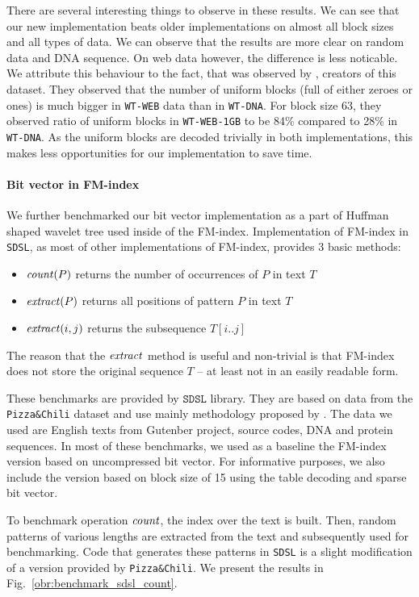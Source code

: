 There are several interesting things to observe in these results. We can see that our new implementation
beats older implementations on almost all block sizes and all types of data. We can observe that the
results are more clear on random data and DNA sequence. On web data however, the difference is less
noticable. We attribute this behaviour to the fact, that was observed by \cite{gog2014optimized},
creators of this dataset. They observed that the number of uniform blocks (full of either zeroes or ones)
is much bigger in \texttt{WT-WEB} data than in \texttt{WT-DNA}. For block size 63, they observed ratio of
uniform blocks in \texttt{WT-WEB-1GB} to be 84\% compared to 28\% in \texttt{WT-DNA}. As the uniform
blocks are decoded trivially in both implementations, this makes less opportunities for our implementation
to save time.

\paragraph{Bit vector in FM-index}

We further benchmarked our bit vector implementation as a part of Huffman shaped wavelet tree
used inside of the FM-index. Implementation of FM-index in \texttt{SDSL}, as most of other
implementations of FM-index, provides 3 basic methods:
\begin{itemize}
	\item $\mathit{count}(P)$ returns the number of occurrences of $P$ in text $T$
	\item $\mathit{extract}(P)$ returns all positions of pattern $P$ in text $T$
	\item $\mathit{extract}(i, j)$ returns the subsequence $T[i..j]$
\end{itemize}
The reason that the $\mathit{extract}$ method is useful and non-trivial is that FM-index
does not store the original sequence $T$ -- at least not in an easily readable form.

These benchmarks are provided by $\texttt{SDSL}$ library. They are based on data from
the \texttt{Pizza\&Chili} dataset and use mainly methodology proposed by \cite{ferragina2009compressed}.
The data we used are English texts from Gutenber project, source codes, DNA and protein
sequences. In most of these benchmarks, we used as a baseline the FM-index version based
on uncompressed bit vector. For informative purposes, we also include the version based
on block size of 15 using the table decoding and sparse bit vector.

To benchmark operation $\mathit{count}$, the index over the text is built. Then, random patterns of
various lengths are extracted from the text and subsequently used for benchmarking. Code
that generates these patterns in \texttt{SDSL} is a slight modification of a version provided
by \texttt{Pizza\&Chili}. We present the results in Fig.~\ref{obr:benchmark_sdsl_count}.

